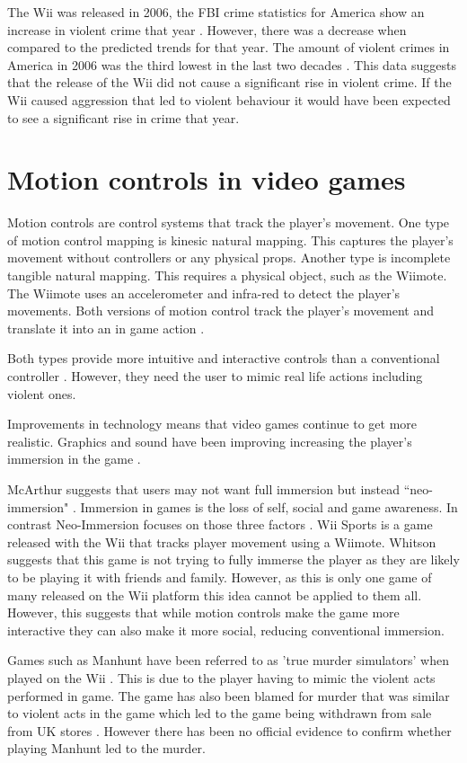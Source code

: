 \documentclass{scrartcl}
\begin{document}
The Wii was released in 2006, the FBI crime statistics for America show an increase in violent crime that year \cite{FBI}.  However, there was a decrease when compared to the predicted trends for that year. The amount of violent crimes in America in 2006 was the third lowest in the last two decades \cite{FBIArchives}. This data suggests that the release of the Wii did not cause a significant rise in violent crime. If the Wii caused aggression that led to violent behaviour it would have been expected to see a significant rise in crime that year.


\section{Motion controls in video games}
Motion controls are control systems that track the player's movement. One type of motion control mapping is kinesic natural mapping. This captures the player's movement without controllers or any physical props. Another type is incomplete tangible natural mapping. This requires a physical object, such as the Wiimote. The Wiimote uses an accelerometer and infra-red to detect the player's movements. Both versions of motion control track the player's movement and translate it into an in game action \cite{McEwan2012}.

Both types provide more intuitive and interactive controls than a conventional controller \cite{Kim}.  However, they need the user to mimic real life actions including violent ones. 

Improvements in technology means that video games continue to get more realistic. Graphics and sound have been improving increasing the player's immersion in the game \cite{Kim}.


\bigskip
McArthur suggests that users may not want full immersion but instead ``neo-immersion" \cite{McArthur}. Immersion in games is the loss of self, social and game awareness. In contrast Neo-Immersion focuses on those three factors \cite{Whitson}. Wii Sports is a game released with the Wii that tracks player movement using a Wiimote. Whitson suggests that this game is not trying to fully immerse the player as they are likely to be playing it with friends and family. However, as this is only one game of many released on the Wii platform this idea cannot be applied to them all. However, this suggests that while motion controls make the game more interactive they can also make it more social, reducing conventional immersion.

Games such as Manhunt have been referred to as 'true murder simulators' when played on the Wii \cite{Manhunt}. This is due to the player having to mimic the violent acts performed in game. 
The game has also been blamed for murder that was similar to violent acts in the game which led to the game being withdrawn from sale from UK stores \cite{Manhunt2Ban, ManhuntMurder}. However there has been no official evidence to confirm whether playing Manhunt led to the murder. 
\end{document}
